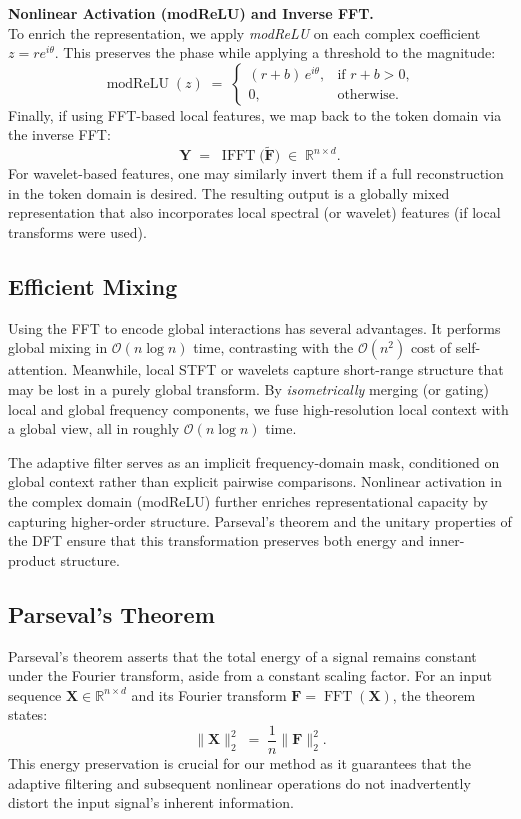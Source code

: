 \textbf{ Nonlinear Activation (modReLU) and Inverse FFT.}\\
To enrich the representation, we apply \emph{modReLU} \cite{arjovsky2016unitary} on each complex coefficient \(z = re^{i\theta}\). This preserves the phase while applying a threshold to the magnitude:
\[
\operatorname{modReLU}(z) 
\;=\;
\begin{cases}
(r + b)\,e^{i\theta}, & \text{if } r + b > 0,\\[3pt]
0, & \text{otherwise}.
\end{cases}
\]
Finally, if using FFT-based local features, we map back to the token domain via the inverse FFT:
\[
\mathbf{Y} \;=\; \operatorname{IFFT}\bigl(\tilde{\mathbf{F}}\bigr) \;\in\; \mathbb{R}^{n \times d}.
\]
For wavelet-based features, one may similarly invert them if a full reconstruction in the token domain is desired. The resulting output is a globally mixed representation that also incorporates local spectral (or wavelet) features (if local transforms were used).

\subsection{Efficient Mixing}
Using the FFT to encode global interactions has several advantages. It performs global mixing in \(\mathcal{O}(n \log n)\) time, contrasting with the \(\mathcal{O}(n^2)\) cost of self-attention. Meanwhile, local STFT or wavelets capture short-range structure that may be lost in a purely global transform. By \emph{isometrically} merging (or gating) local and global frequency components, we fuse high-resolution local context with a global view, all in roughly \(\mathcal{O}(n \log n)\) time.

The adaptive filter serves as an implicit frequency-domain mask, conditioned on global context rather than explicit pairwise comparisons. Nonlinear activation in the complex domain (modReLU) further enriches representational capacity by capturing higher-order structure. Parseval's theorem and the unitary properties of the DFT ensure that this transformation preserves both energy and inner-product structure.

\subsection{Parseval's Theorem}
Parseval's theorem asserts that the total energy of a signal remains constant under the Fourier transform, aside from a constant scaling factor. For an input sequence \(\mathbf{X} \in \mathbb{R}^{n \times d}\) and its Fourier transform \(\mathbf{F} = \operatorname{FFT}(\mathbf{X})\), the theorem states:
\[
\|\mathbf{X}\|_2^2 \;=\; \frac{1}{n}\|\mathbf{F}\|_2^2.
\]
This energy preservation is crucial for our method as it guarantees that the adaptive filtering and subsequent nonlinear operations do not inadvertently distort the input signal's inherent information.

